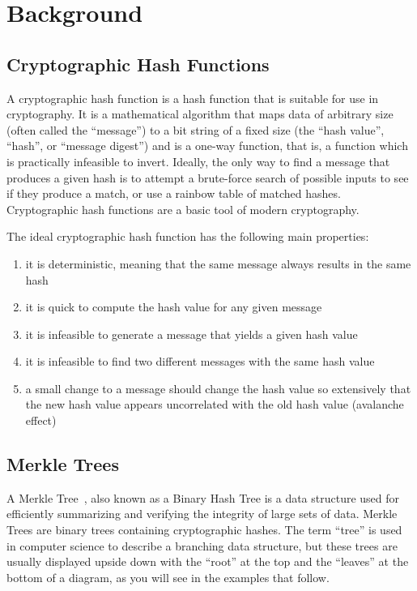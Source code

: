 \chapter{Background}

\section{Cryptographic Hash Functions}

A cryptographic hash function is a hash function that is suitable for use
in cryptography. It is a mathematical algorithm that maps data of arbitrary
size (often called the ``message'') to a bit string of a fixed size (the ``hash
value'', ``hash'', or ``message digest'') and is a one-way function, that is, a
function which is practically infeasible to invert. Ideally, the only way to
find a message that produces a given hash is to attempt a brute-force search of
possible inputs to see if they produce a match, or use a rainbow table of
matched hashes. Cryptographic hash functions are a basic tool of modern
cryptography.

The ideal cryptographic hash function has the following main properties:

\begin{enumerate}
\item it is deterministic, meaning that the same message always results in the same hash
\item it is quick to compute the hash value for any given message
\item it is infeasible to generate a message that yields a given hash value
\item it is infeasible to find two different messages with the same hash value
\item a small change to a message should change the hash value so extensively that the new hash value appears uncorrelated with the old hash value (avalanche effect)
\end{enumerate}

\section{Merkle Trees}

A Merkle Tree~\cite{merkle}, also known as a Binary Hash Tree is a data structure used for
efficiently summarizing and verifying the integrity of large sets of data.
Merkle Trees are binary trees containing cryptographic hashes. The term
``tree'' is used in computer science to describe a branching data structure,
but these trees are usually displayed upside down with the ``root'' at the top
and the ``leaves'' at the bottom of a diagram, as you will see in the examples
that follow.

